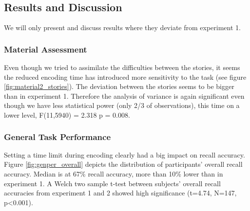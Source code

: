 \documentclass[a4paper,man,natbib,floatsintext,import]{apa6}
\begin{document}
\subsection{Results and Discussion}
We will only present and discuss results where they deviate from experiment 1.

\subsubsection{Material Assessment}
Even though we tried to assimilate the difficulties between the stories, it seems the reduced encoding time has introduced more sensitivity to the task (see figure \ref{fig:material2_stories}). The deviation between the stories seems to be bigger than in experiment 1. Therefore the analysis of variance is again significant even though we have less statistical power (only 2/3 of observations), this time on a lower level, F(11,5940) = 2.318 p = 0.008.

\subsubsection{General Task Performance}
Setting a time limit during encoding clearly had a big impact on recall accuracy. Figure \ref{fig:genper_overall} depicts the distribution of participants' overall recall accuracy. Median is at 67\% recall accuracy, more than 10\% lower than in experiment 1. A Welch two sample t-test between subjects' overall recall accuracies from experiment 1 and 2 showed high significance (t=4.74, N=147, p<0.001).
\end{document}
